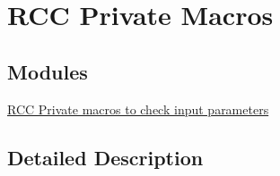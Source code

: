 \hypertarget{group___r_c_c___private___macros}{}\section{R\+CC Private Macros}
\label{group___r_c_c___private___macros}
\subsection*{Modules}
\begin{DoxyCompactItemize}
\item 
\hyperlink{group___r_c_c___i_s___r_c_c___definitions}{R\+C\+C Private macros to check input parameters}
\end{DoxyCompactItemize}


\subsection{Detailed Description}
